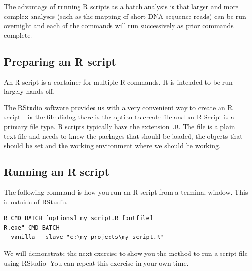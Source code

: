 \documentclass[a4paper]{book}
\begin{document}
The advantage of running R scripts as a batch analysis is that larger
and more complex analyses (such as the mapping of short DNA sequence
reads) can be run overnight and each of the commands will run
successively as prior commands complete.

\subsection{Preparing an R script}\label{preparing-an-r-script}

An R script is a container for multiple R commands. It is intended to be
run largely hands-off.

The RStudio software provides us with a very convenient way to create an
R script - in the file dialog there is the option to create file and an
R Script is a primary file type. R scripts typically have the extension
\texttt{.R}. The file is a plain text file and needs to know the
packages that should be loaded, the objects that should be set and the
working environment where we should be working.

\subsection{Running an R script}\label{running-an-r-script}

The following command is how you run an R script from a terminal window.
This is outside of RStudio.

\begin{verbatim}
R CMD BATCH [options] my_script.R [outfile]
R.exe" CMD BATCH
--vanilla --slave "c:\my projects\my_script.R"
\end{verbatim}

We will demonstrate the next exercise to show you the method to run a
script file using RStudio. You can repeat this exercise in your own
time.
\end{document}
